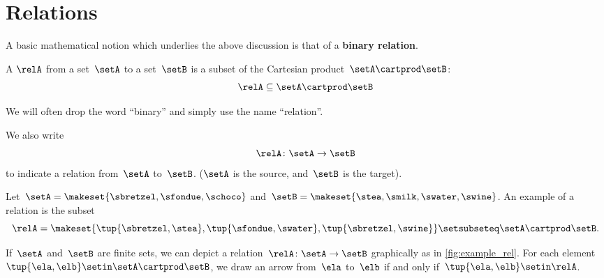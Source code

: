 
\section{Relations}
\label{sec:connection-relations}

A basic mathematical notion which underlies the above discussion is that of a \textbf{binary relation}.

\begin{ctdefinition}
    \label{def:binary-relation}
    A \emph{} $\relA$ from a set~$\setA$ to a set~$\setB$ is a subset of the Cartesian product~$\setA\cartprod \setB$:
    \begin{equation}
        \relA \subseteq \setA \cartprod \setB
    \end{equation}
\end{ctdefinition}

We will often drop the word ``binary'' and simply use the name ``relation''.

We also write
\begin{equation*}
    \relA \colon \setA \to \setB
\end{equation*}
to indicate a relation from~$\setA$ to~$\setB$.
($\setA$ is the source, and~$\setB$ is the target).

\begin{marginfigure}
    \centering
    \caption{}
    \label{fig:example_rel}
\end{marginfigure}

\begin{example}
    \label{exa:simple-rel}
    Let~$\setA = \makeset{ \sbretzel, \sfondue, \schoco}$ and~$\setB = \makeset{ \stea, \smilk, \swater, \swine }$.
    An example of a relation is the subset
    \begin{equation*}
        \relA = \makeset{ \tup{\sbretzel, \stea}, \tup{\sfondue, \swater}, \tup{\sbretzel, \swine} } \setsubseteq \setA \cartprod \setB.
    \end{equation*}
\end{example}

If~$\setA$ and~$\setB$ are finite sets, we can depict a relation~$\relA \colon \setA \to \setB$ graphically as in \cref{fig:example_rel}.
For each element~$\tup{\ela,\elb} \setin \setA \cartprod \setB$, we draw an arrow from~$\ela$ to~$\elb$ if and only if~$\tup{\ela,\elb} \setin \relA$.

